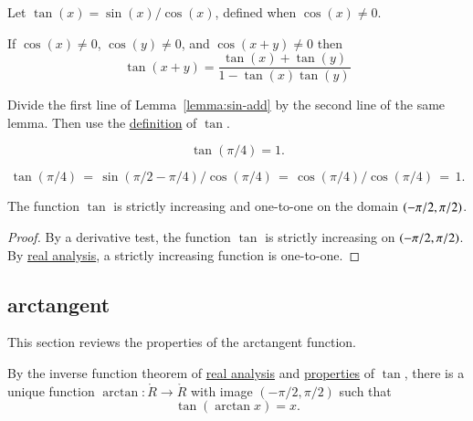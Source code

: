 \begin{definition}[tangent]\label{def:tan}
Let $\tan(x) = \sin(x)/\cos(x)$, defined when $\cos(x)\ne0$.
%
%
\end{definition}


\begin{lemma}\label{lemma:tan-add}
    If $\cos(x)\ne 0$, $\cos(y)\ne 0$, and $\cos(x+y)\ne0$ then
    $$\tan(x+y) = \frac{\tan(x) + \tan(y) }{ 1 - \tan(x)\tan(y)}$$
\end{lemma}
%

\begin{proved}
  Divide the first line of Lemma~\ref{lemma:sin-add} by the second
  line of the same lemma.  Then use the \hyperref[def:tan]{definition} of $\tan$.
\swallowed\end{proved}

\begin{lemma}\label{lemma:tan-pi4}
    $$\tan(\pi/4) = 1.$$
\end{lemma}

\begin{proved}  
    $$\tan(\pi/4) \hyperref[def:tan]{\,=\,} \sin(\pi/2-\pi/4)/\cos(\pi/4) 
    \hyperref[lemma:cos-sin]{\,=\,}
    \cos(\pi/4)/\cos(\pi/4) \hyperref[eqn:cospi2]{\,=\,} 1.$$
\swallowed\end{proved}

\begin{lemma}\label{lemma:tan-monotone}
The function $\tan$ is strictly increasing and one-to-one on the domain
$(-\pi/2,\pi/2)$.
\end{lemma}

\begin{proof} By a derivative test,
the function $\tan$ is strictly increasing on $(-\pi/2,\pi/2)$.
By \hyperref[back:analysis]{real analysis}, 
a strictly increasing function is one-to-one.
\end{proof}

\subsection{arctangent}

This section reviews the properties of the arctangent function.  

\begin{definition}[arctangent]\label{def:arctan}
By the inverse function theorem of \hyperref[back:analysis]{real analysis} and
\hyperref[lemma:tan-monotone]{properties} of $\tan$, 
there is a unique function $\arctan:\ring{R}\to\ring{R}$ with
image $(-\pi/2,\pi/2)$ such that
    $$\tan(\arctan x) =x.$$
%
\end{definition}

